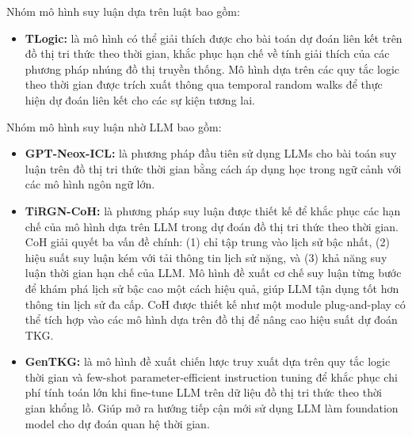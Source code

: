 Nhóm mô hình suy luận dựa trên luật bao gồm:
\begin{itemize}
    \item \textbf{TLogic:} là mô hình có thể giải thích được cho bài toán dự đoán liên kết trên đồ thị tri thức theo thời gian, khắc phục hạn chế về tính giải thích của các phương pháp nhúng đồ thị truyền thống. Mô hình dựa trên các quy tắc logic theo thời gian được trích xuất thông qua temporal random walks để thực hiện dự đoán liên kết cho các sự kiện tương lai.
\end{itemize}

Nhóm mô hình suy luận nhờ LLM bao gồm:
\begin{itemize}
    \item \textbf{GPT-Neox-ICL:} là phương pháp đầu tiên sử dụng LLMs cho bài toán suy luận trên đồ thị tri thức thời gian bằng cách áp dụng học trong ngữ cảnh với các mô hình ngôn ngữ lớn.
    \item \textbf{TiRGN-CoH:} là phương pháp suy luận được thiết kế để khắc phục các hạn chế của mô hình dựa trên LLM trong dự đoán đồ thị tri thức theo thời gian. CoH giải quyết ba vấn đề chính: (1) chỉ tập trung vào lịch sử bậc nhất, (2) hiệu suất suy luận kém với tải thông tin lịch sử nặng, và (3) khả năng suy luận thời gian hạn chế của LLM. Mô hình đề xuất cơ chế suy luận từng bước để khám phá lịch sử bậc cao một cách hiệu quả, giúp LLM tận dụng tốt hơn thông tin lịch sử đa cấp. CoH được thiết kế như một module plug-and-play có thể tích hợp vào các mô hình dựa trên đồ thị để nâng cao hiệu suất dự đoán TKG.
    \item \textbf{GenTKG:} là mô hình đề xuất chiến lược truy xuất dựa trên quy tắc logic thời gian và few-shot parameter-efficient instruction tuning để khắc phục chi phí tính toán lớn khi fine-tune LLM trên dữ liệu đồ thị tri thức theo thời gian khổng lồ. Giúp mở ra hướng tiếp cận mới sử dụng LLM làm foundation model cho dự đoán quan hệ thời gian.
\end{itemize}

